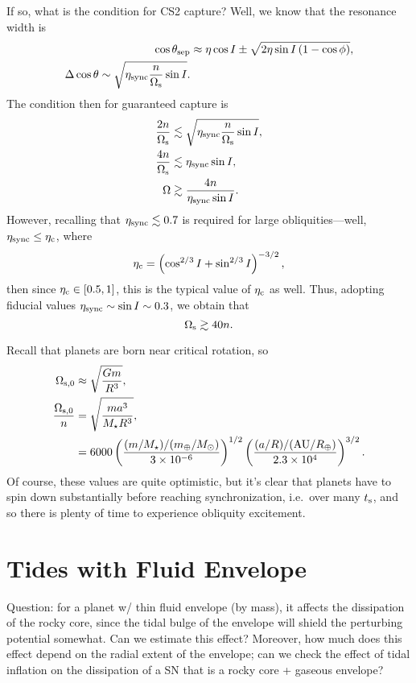 \documentclass[12pt]{article}
\newcommand*{\scinot}[2]{#1\times10^{#2}}
\newcommand*{\p}[1]{\left(#1\right)}
\begin{document}
If so, what is the condition for CS2 capture? Well, we know that the resonance
width is
\begin{align}
    \cos \theta_{\rm sep}
        &\approx \eta \cos I \pm \sqrt{2\eta \sin I
            \p{1 - \cos \phi}},\\
    \Delta \cos\theta \sim \sqrt{\eta_{\rm sync}\frac{n}{\Omega_{\rm s}}
        \sin I}.
\end{align}
The condition then for guaranteed capture is
\begin{align}
    \frac{2n}{\Omega_{\rm s}} &\lesssim \sqrt{\eta_{\rm sync}
        \frac{n}{\Omega_{\rm s}}\sin I},\\
    \frac{4n}{\Omega_{\rm s}} &\lesssim \eta_{\rm sync}\sin I,\\
    \Omega &\gtrsim \frac{4n}{\eta_{\rm sync}\sin I}.
\end{align}
However, recalling that $\eta_{\rm sync} \lesssim 0.7$ is required for large
obliquities---well, $\eta_{\rm sync} \leq \eta_{\rm c}$, where
\begin{equation}
    \eta_{\rm c} = \p{\cos^{2/3}I + \sin^{2/3}I}^{-3/2},
\end{equation}
then since $\eta_{\rm c} \in [0.5, 1]$, this is the typical value of $\eta_{\rm
c}$ as well. Thus, adopting fiducial values $\eta_{\rm sync} \sim \sin I \sim
0.3$, we obtain that
\begin{equation}
    \Omega_{\rm s} \gtrsim 40n.
\end{equation}

Recall that planets are born near critical rotation, so
\begin{align}
    \Omega_{\rm s, 0} &\approx \sqrt{\frac{Gm}{R^3}},\\
    \frac{\Omega_{\rm s, 0}}{n}
        &= \sqrt{\frac{ma^3}{M_\star R^3}},\\
        &=
            6000
            \p{\frac{(m/M_\star)/(m_\oplus/M_\odot)}{\scinot{3}{-6}}}^{1/2}
            \p{\frac{(a/R) / (\mathrm{AU} / R_\oplus)}{\scinot{2.3}{4}}}^{3/2}.
\end{align}
Of course, these values are quite optimistic, but it's clear that planets have
to spin down substantially before reaching synchronization, i.e.\ over many
$t_{\rm s}$, and so there is plenty of time to experience obliquity excitement.

\section{Tides with Fluid Envelope}

Question: for a planet w/ thin fluid envelope (by mass), it affects the
dissipation of the rocky core, since the tidal bulge of the envelope will shield
the perturbing potential somewhat. Can we estimate this effect? Moreover, how
much does this effect depend on the radial extent of the envelope; can we check
the effect of tidal inflation on the dissipation of a SN that is a rocky core +
gaseous envelope?
\end{document}
